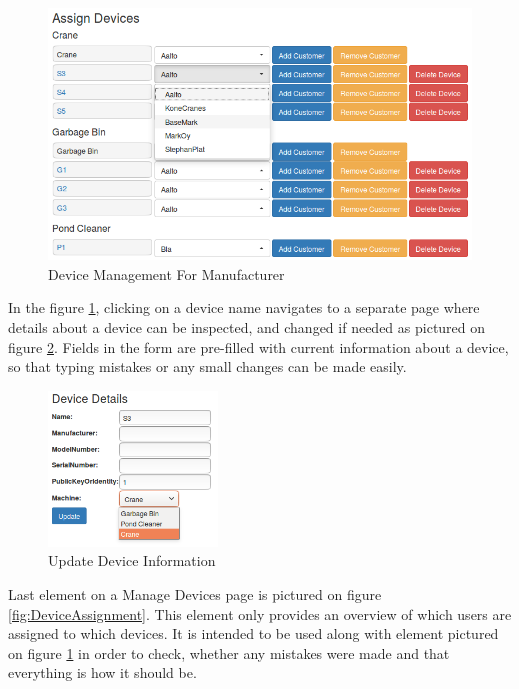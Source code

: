 \begin{figure}[ht]
	\begin{center}
		\includegraphics[width=\textwidth]{images/implementation/ManageDevicesCompany}
		\caption{Device Management For Manufacturer}
		\label{fig:ManageDevicesCompany}
	\end{center}
\end{figure}	

In the figure \ref{fig:ManageDevicesCompany}, clicking on a device name navigates to a separate page where details about a device can be inspected, and changed if needed as pictured on figure \ref{fig:DeviceDetailsUpdate}. Fields in the form are pre-filled with current information about a device, so that typing mistakes or any small changes can be made easily.

\begin{figure}[ht]
	\begin{center}
		\includegraphics[width=0.4\textwidth]{images/implementation/DeviceDetailsUpdate}
		\caption{Update Device Information}
		\label{fig:DeviceDetailsUpdate}
	\end{center}
\end{figure}

Last element on a Manage Devices page is pictured on figure \ref{fig:DeviceAssignment}. This element only provides an overview of which users are assigned to which devices. It is intended to be used along with element pictured on figure \ref{fig:ManageDevicesCompany} in order to check, whether any mistakes were made and that everything is how it should be.

